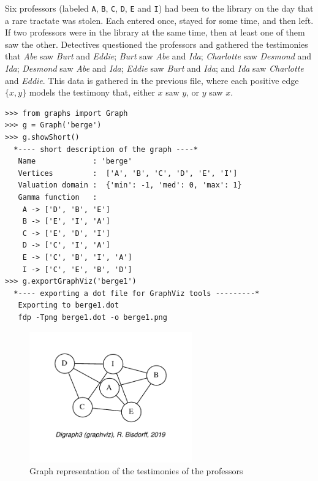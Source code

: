 Six professors (labeled \texttt{A}, \texttt{B}, \texttt{C}, \texttt{D}, \texttt{E} and \texttt{I}) had been to the library on the day that a rare tractate was stolen. Each entered once, stayed for some time, and then left. If two professors were in the library at the same time, then at least one of them saw the other. Detectives questioned the professors and gathered the testimonies that \emph{Abe} saw \emph{Burt} and \emph{Eddie}; \emph{Burt} saw \emph{Abe} and \emph{Ida}; \emph{Charlotte} saw \emph{Desmond} and \emph{Ida}; \emph{Desmond} saw \emph{Abe} and \emph{Ida}; \emph{Eddie} saw \emph{Burt} and \emph{Ida}; and \emph{Ida} saw \emph{Charlotte} and \emph{Eddie}. This data is gathered in the previous file, where each positive edge $\{x,y\}$ models the testimony that, either $x$ saw $y$, or $y$ saw $x$.
\begin{lstlisting}
>>> from graphs import Graph
>>> g = Graph('berge')
>>> g.showShort()
  *---- short description of the graph ----*
   Name             : 'berge'
   Vertices         :  ['A', 'B', 'C', 'D', 'E', 'I']
   Valuation domain :  {'min': -1, 'med': 0, 'max': 1}
   Gamma function   : 
    A -> ['D', 'B', 'E']
    B -> ['E', 'I', 'A']
    C -> ['E', 'D', 'I']
    D -> ['C', 'I', 'A']
    E -> ['C', 'B', 'I', 'A']
    I -> ['C', 'E', 'B', 'D']
>>> g.exportGraphViz('berge1')
  *---- exporting a dot file for GraphViz tools ---------*
   Exporting to berge1.dot
   fdp -Tpng berge1.dot -o berge1.png
\end{lstlisting}
\begin{figure}[h]
\sidecaption[t]
\includegraphics[width=7cm]{Figures/23-2-berge1.pdf}
\caption{Graph representation of the testimonies of the professors} 
\label{fig:23.2}       %
\end{figure}

